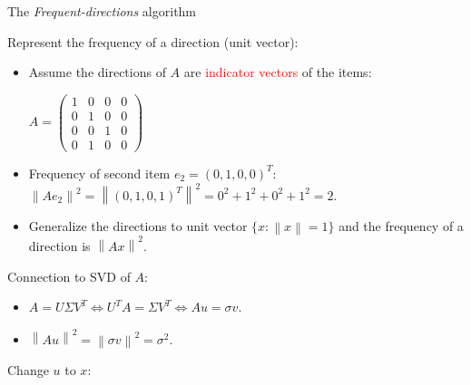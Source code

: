 \documentclass[first=dgreen,second=purple,logo=redque]{aaltoslides}
\newcommand{\vectornorm}[1]{\left\|#1\right\|}
\begin{document}
\begin{frame}[allowframebreaks=1]{The \textit{Frequent-directions} algorithm}


Represent the \textcolor{dgreen}{frequency} of a direction (unit vector):
\begin{itemize}
  \item Assume the directions of $A$ are \textcolor{red}{indicator vectors} of the items: \\
  \begin{center}
  \vspace{2 mm}
  $A = \begin{pmatrix}
       1 & 0 & 0 & 0\\[0.3em] 
       0 & 1 & 0 & 0\\[0.3em]
       0 & 0 & 1 & 0\\[0.3em]
       0 & 1 & 0 & 0
     \end{pmatrix}$
  \end{center}
  \item Frequency of second item $e_2 = (0,1,0,0)^T$:
  $ \vectornorm{Ae_2}^2 = \vectornorm{(0,1,0,1)^T} ^2= 0^2 + 1^2 + 0^2 + 1^2 = 2$. 
  \item Generalize the directions to unit vector $\{x : \vectornorm{x}=1\} $ and the \textcolor{dgreen}{frequency} of a direction is $\vectornorm{Ax}^2$.
\end{itemize}

\framebreak
Connection to SVD of $A$:
\begin{itemize}
  \item $A = U\Sigma V^T \Leftrightarrow U^TA = \Sigma V^T \Leftrightarrow Au = \sigma v$.
  \item $\vectornorm{Au}^2 = \vectornorm{\sigma v}^2 = \sigma^2$.
\end{itemize}
  \vspace{2 mm}
Change $u$ to $x$: \\
  \vspace{2 mm}


\end{frame}
\end{document}
